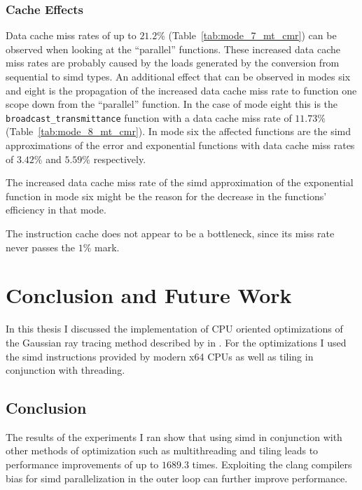 \documentclass[a4paper, 11pt]{memoir}
\begin{document}
    \subsection{Cache Effects}
    \label{sec:res_cache}
    Data cache miss rates of up to $21.2\%$ (Table~\ref{tab:mode_7_mt_cmr}) can be observed when looking at the
    \enquote{parallel} functions. These increased data cache miss rates are probably caused by the loads generated by the
    conversion from sequential to \gls{simd} types. An additional effect that can be observed in modes six and eight is
    the propagation of the increased data cache miss rate to function one scope down from the \enquote{parallel} function.
    In the case of mode eight this is the \texttt{broadcast_transmittance} function with a data cache miss rate
    of $11.73\%$ (Table~\ref{tab:mode_8_mt_cmr}). In mode six the affected functions are the \gls{simd} approximations
    of the error and exponential functions with data cache miss rates of $3.42\%$ and $5.59\%$ respectively.

    The increased data cache miss rate of the \gls{simd} approximation of the exponential function in mode six might be
    the reason for the decrease in the functions' efficiency in that mode.

    The instruction cache does not appear to be a bottleneck, since its miss rate never passes the $1\%$ mark.

    \chapter{Conclusion and Future Work}
    \label{ch:conclusions}
    In this thesis I discussed the implementation of CPU oriented optimizations of the Gaussian ray tracing method described
    by \citeauthor{Rhodin:2015} in \cite{Rhodin:2015}. For the optimizations I used the \gls{simd} instructions provided
    by modern x64 CPUs as well as tiling in conjunction with threading.

    \section{Conclusion}
    \label{sec:conclusions}
    The results of the experiments I ran show that using \gls{simd} in conjunction with other methods of optimization such
    as multithreading and tiling leads to performance improvements of up to $1689.3$ times. Exploiting the clang compilers
    bias for \gls{simd} parallelization in the outer loop can further improve performance.
\end{document}
